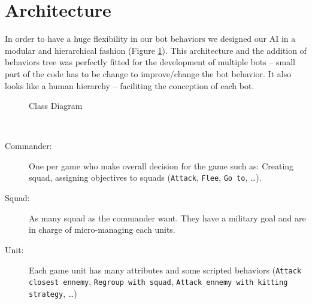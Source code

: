 \section{Architecture}

In order to have a huge flexibility in our bot behaviors we designed our AI in a modular and hierarchical fashion (Figure \ref{classDiag}).
This architecture and the addition of behaviors tree was perfectly fitted for the development of multiple bots -- small part of the code has to be change to improve/change the bot behavior.
It also looks like a human hierarchy -- faciliting the conception of each bot.

\begin{figure}[h!t]
\centering
{}
\caption{Class Diagram}
\label{classDiag}
\end{figure}

\begin{definition}
    \ \\
    \begin{description}
        \item[Commander:]  One per game who make overall decision for the game such as: Creating squad, assigning objectives to squads (\texttt{Attack}, \texttt{Flee}, \texttt{Go to}, \ldots).
        \item[Squad:] As many squad as the commander want. They have a military goal and are in charge of micro-managing each units. 
        \item[Unit:] Each game unit has many attributes and some scripted behaviors (\texttt{Attack closest ennemy}, \texttt{Regroup with squad}, \texttt{Attack ennemy with kitting strategy}, \ldots)
    \end{description}
\end{definition}

